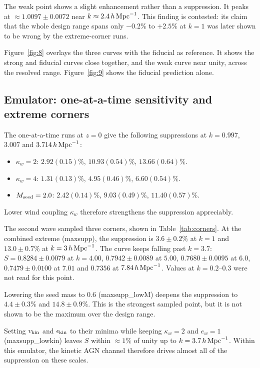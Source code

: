 \documentclass[11pt,a4paper]{article}
\begin{document}
The weak point shows a slight enhancement rather than a suppression. It peaks at $\approx1.0097\pm0.0072$ near $k\approx2.4\,h\,{\rm Mpc}^{-1}$. This finding is contested: its claim that the whole design range spans only $-0.2\%$ to $+2.5\%$ at $k=1$ was later shown to be wrong by the extreme-corner runs.

Figure~\ref{fig:8} overlays the three curves with the fiducial as reference. It shows the strong and fiducial curves close together, and the weak curve near unity, across the resolved range. Figure~\ref{fig:9} shows the fiducial prediction alone.











\subsection{Emulator: one-at-a-time sensitivity and extreme corners}
The one-at-a-time runs at $z=0$ give the following suppressions at $k=0.997$, $3.007$ and $3.714\,h\,{\rm Mpc}^{-1}$:
\begin{itemize}
\item $\kappa_w=2$: $2.92(0.15)\%$, $10.93(0.54)\%$, $13.66(0.64)\%$.
\item $\kappa_w=4$: $1.31(0.13)\%$, $4.95(0.46)\%$, $6.60(0.54)\%$.
\item $M_{\rm seed}=2.0$: $2.42(0.14)\%$, $9.03(0.49)\%$, $11.40(0.57)\%$.
\end{itemize}
Lower wind coupling $\kappa_w$ therefore strengthens the suppression appreciably.

The second wave sampled three corners, shown in Table~\ref{tab:corners}. At the combined extreme (maxsupp), the suppression is $3.6\pm0.2\%$ at $k=1$ and $13.0\pm0.7\%$ at $k=3\,h\,{\rm Mpc}^{-1}$. The curve keeps falling past $k=3.7$: $S=0.8284\pm0.0079$ at $k=4.00$, $0.7942\pm0.0089$ at $5.00$, $0.7680\pm0.0095$ at $6.0$, $0.7479\pm0.0100$ at $7.01$ and $0.7356$ at $7.84\,h\,{\rm Mpc}^{-1}$. Values at $k=0.2$--$0.3$ were not read for this point.

Lowering the seed mass to $0.6$ (maxsupp\_lowM) deepens the suppression to $4.4\pm0.3\%$ and $14.8\pm0.9\%$. This is the strongest sampled point, but it is not shown to be the maximum over the design range.

Setting $v_{\rm kin}$ and $\epsilon_{\rm kin}$ to their minima while keeping $\kappa_w=2$ and $e_w=1$ (maxsupp\_lowkin) leaves $S$ within $\approx1\%$ of unity up to $k=3.7\,h\,{\rm Mpc}^{-1}$. Within this emulator, the kinetic AGN channel therefore drives almost all of the suppression on these scales.
\end{document}
